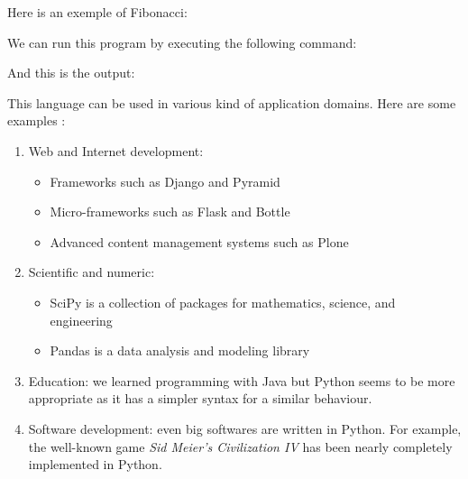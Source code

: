 Here is an exemple of Fibonacci:


We can run this program by executing the following command:


And this is the output:


This language can be used in various kind of application domains. Here are some examples \cite{python_applications}:
\begin{enumerate}
    \item {Web and Internet development:
        \begin{itemize}
            \item Frameworks such as Django and Pyramid
            \item Micro-frameworks such as Flask and Bottle
            \item Advanced content management systems such as Plone
        \end{itemize}
    }
    \item {Scientific and numeric:
        \begin{itemize}
            \item SciPy is a collection of packages for mathematics, science, and engineering
            \item Pandas is a data analysis and modeling library
        \end{itemize}
    
    }
    \item Education: we learned programming with Java but Python seems to be more appropriate as it has a simpler syntax for a similar behaviour.
    \item Software development: even big softwares are written in Python. For example, the well-known game \emph{Sid Meier's Civilization IV} has been nearly completely implemented in Python.
\end{enumerate}
